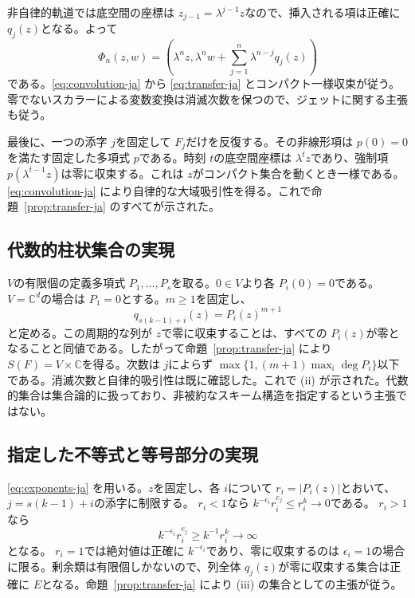 \documentclass[12pt]{amsart}
\theoremstyle{definition}
\theoremstyle{remark}
\numberwithin{equation}{section}
\newcommand{\C}{\mathbb{C}}
\begin{document}
非自律的軌道では底空間の座標は \allowbreak$z_{j-1}=\lambda^{j-1}z$\allowbreak なので、挿入される項は正確に \allowbreak$q_j(z)$\allowbreak となる。よって
\begin{equation}\label{eq:explicit-orbit-ja}
\Phi_n(z,w)=\left(\lambda^nz,
\lambda^nw+\sum_{j=1}^n\lambda^{n-j}q_j(z)\right)
\end{equation}
である。\eqref{eq:convolution-ja} から \eqref{eq:transfer-ja} とコンパクト一様収束が従う。零でないスカラーによる変数変換は消滅次数を保つので、ジェットに関する主張も従う。

最後に、一つの添字 \allowbreak$j$\allowbreak を固定して \allowbreak$F_j$\allowbreak だけを反復する。その非線形項は \allowbreak$p(0)=0$\allowbreak を満たす固定した多項式 \allowbreak$p$\allowbreak である。時刻 \allowbreak$t$\allowbreak の底空間座標は \allowbreak$\lambda^t z$\allowbreak であり、強制項 \allowbreak$p(\lambda^{t-1}z)$\allowbreak は零に収束する。これは \allowbreak$z$\allowbreak がコンパクト集合を動くとき一様である。\eqref{eq:convolution-ja} により自律的な大域吸引性を得る。これで命題~\ref{prop:transfer-ja} のすべてが示された。

\subsection{代数的柱状集合の実現}
\allowbreak$V$\allowbreak の有限個の定義多項式 \allowbreak$P_1,\ldots,P_s$\allowbreak を取る。\allowbreak$0\in V$\allowbreak より各 \allowbreak$P_i(0)=0$\allowbreak である。\allowbreak$V=\C^d$\allowbreak の場合は \allowbreak$P_1=0$\allowbreak とする。\allowbreak$m\geq1$\allowbreak を固定し、
\[
q_{s(k-1)+i}(z)=P_i(z)^{m+1}
\]
と定める。この周期的な列が \allowbreak$z$\allowbreak で零に収束することは、すべての \allowbreak$P_i(z)$\allowbreak が零となることと同値である。したがって命題~\ref{prop:transfer-ja} により \allowbreak$S(F)=V\times\C$\allowbreak を得る。次数は \allowbreak$j$\allowbreak によらず \allowbreak$\max\{1,(m+1)\max_i\deg P_i\}$\allowbreak 以下である。消滅次数と自律的吸引性は既に確認した。これで (ii) が示された。代数的集合は集合論的に扱っており、非被約なスキーム構造を指定するという主張ではない。

\subsection{指定した不等式と等号部分の実現}
\eqref{eq:exponents-ja} を用いる。\allowbreak$z$\allowbreak を固定し、各 \allowbreak$i$\allowbreak について \allowbreak$r_i=|P_i(z)|$\allowbreak とおいて、\allowbreak$j=s(k-1)+i$\allowbreak の添字に制限する。
\allowbreak$r_i<1$\allowbreak なら \allowbreak$k^{-\epsilon_i}r_i^{e_j}\leq r_i^k\to0$\allowbreak である。
\allowbreak$r_i>1$\allowbreak なら
\[
k^{-\epsilon_i}r_i^{e_j}\geq k^{-1}r_i^k\longrightarrow\infty
\]
となる。
\allowbreak$r_i=1$\allowbreak では絶対値は正確に \allowbreak$k^{-\epsilon_i}$\allowbreak であり、零に収束するのは \allowbreak$\epsilon_i=1$\allowbreak の場合に限る。剰余類は有限個しかないので、列全体 \allowbreak$q_j(z)$\allowbreak が零に収束する集合は正確に \allowbreak$E$\allowbreak となる。命題~\ref{prop:transfer-ja} により (iii) の集合としての主張が従う。
\end{document}
